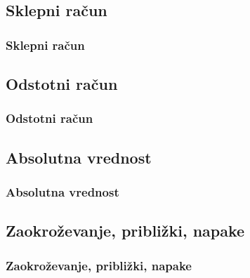      
    \subsection{Sklepni račun}

        \begin{frame}
            \frametitle{Sklepni račun}
        \end{frame}


    \subsection{Odstotni račun}

        \begin{frame}
            \frametitle{Odstotni račun}
        \end{frame}


    \subsection{Absolutna vrednost}

        \begin{frame}
            \frametitle{Absolutna vrednost}
        \end{frame}

    \subsection{Zaokroževanje, približki, napake}

        \begin{frame}
            \frametitle{Zaokroževanje, približki, napake}
        \end{frame}

   